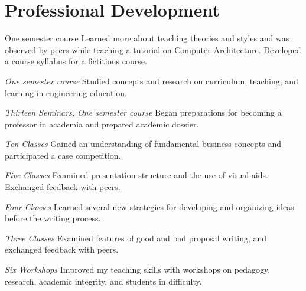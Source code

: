 \section{\sc Professional Development}

{One semester course}{ }
{
  Learned more about teaching theories and styles and was observed by peers while teaching a tutorial on Computer Architecture.
  Developed a course syllabus for a fictitious course.
}

{\em One semester course}{ }
{
  Studied concepts and research on curriculum, teaching, and learning in engineering education.
}

{\em Thirteen Seminars, One semester course}{ }
{
  Began preparations for becoming a professor in academia and prepared academic dossier.
}

{\em Ten Classes}{ }
{
  Gained an understanding of fundamental business concepts and participated a case competition.
}

{\em Five Classes}{ }
{
  Examined presentation structure and the use of visual aids.
  Exchanged feedback with peers.
}

{\em Four Classes}{ }
{
  Learned several new strategies for developing and organizing ideas before the writing process.
}

{\em Three Classes}{ }
{
  Examined features of good and bad proposal writing, and exchanged feedback with peers.
}

{\em Six Workshops}{ }
{
  Improved my teaching skills with workshops on pedagogy, research, academic integrity, and students in difficulty.
}
